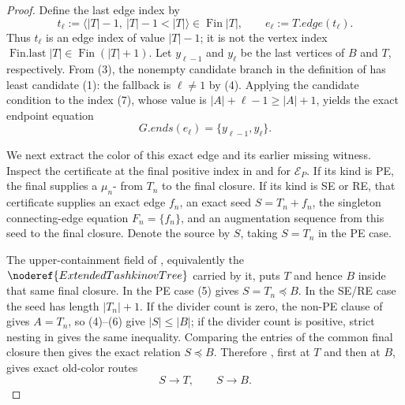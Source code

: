 \begin{proof}
Define the last edge index by
\[
 t_\ell:=\langle |T|-1,\ |T|-1<|T|\rangle\in\operatorname{Fin}|T|,
 \qquad e_\ell:=T.\mathit{edge}(t_\ell).                     \tag{7}
\]
Thus \(t_\ell\) is an edge index of value \(|T|-1\); it is not the vertex
index \(\operatorname{Fin.last}|T|\in\operatorname{Fin}(|T|+1)\).
Let \(y_{\ell-1}\) and \(y_\ell\) be the last vertices of \(B\) and \(T\),
respectively.  From (3), the nonempty candidate branch in the definition of
 has least candidate (1): the fallback is
\(\ell\ne1\) by (4).  Applying the candidate condition to the index (7),
whose value is \(|A|+\ell-1\geq |A|+1\), yields the exact endpoint equation
\[
                  G.\mathit{ends}(e_\ell)
                    =\{y_{\ell-1},y_\ell\}.                  \tag{8}
\]

We next extract the color of this exact edge and its earlier missing
witness.  Inspect the certificate at the final positive index in
 and
 for \(\mathcal E_P\).  If its kind is PE,
the final  supplies a
\(\mu_n\)- from \(T_n\) to the
final closure.  If its kind is SE or RE, that certificate supplies an exact
edge \(f_n\), an exact
 seed \(S=T_n+f_n\), the singleton
connecting-edge equation \(F_n=\{f_n\}\), and an augmentation sequence from
this seed to the final closure.  Denote the source by \(S\), taking
\(S=T_n\) in the PE case.

The upper-containment field of
, equivalently the
\(\noderef{ExtendedTashkinovTree}\) carried by it, puts \(T\) and hence
\(B\) inside that same final closure.  In the PE case (5) gives
\(S=T_n\preccurlyeq B\).  In the SE/RE case the seed has length
\(|T_n|+1\).  If the divider count is zero, the non-PE clause of
 gives \(A=T_n\), so (4)--(6) give
\(|S|\leq|B|\); if the divider count is positive, strict nesting in
 gives the same inequality.  Comparing the
entries of the common final closure then gives the exact relation
\(S\preccurlyeq B\).  Therefore
, first at \(T\) and then at
\(B\), gives exact old-color routes
\[
                            S\longrightarrow T,
              \qquad       S\longrightarrow B.               \tag{9}
\]


\end{proof}
